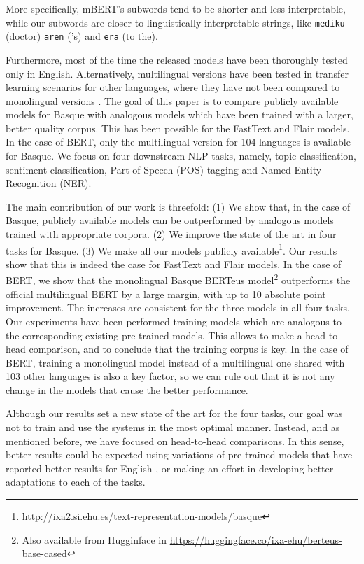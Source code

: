 \documentclass[10pt, a4paper]{article}
\begin{document}
More specifically, mBERT's subwords tend to be shorter and less interpretable, while our subwords are closer to linguistically interpretable strings, like \texttt{mediku} (doctor) \texttt{aren} ('s) and \texttt{era} (to the).

Furthermore, most of the time the released models have been thoroughly tested only in English. Alternatively, multilingual versions have been tested in transfer learning scenarios for other languages, where they have not been compared to monolingual versions \cite{devlin2019bert}.
The goal of this paper is to compare publicly available models for Basque with analogous models which have been trained with a larger, better quality corpus. This has been possible for the FastText and Flair models. In the case of BERT, only the multilingual version for 104 languages is available for Basque. We focus on four downstream NLP tasks, namely, topic classification, sentiment classification, Part-of-Speech (POS) tagging and Named Entity Recognition (NER).

The main contribution of our work is threefold: (1) We show that, in the case of Basque, publicly available models can be outperformed by analogous models trained with appropriate corpora. (2) We improve the state of the art in four tasks for Basque. (3) We make all our models publicly available\footnote{\scriptsize \url{http://ixa2.si.ehu.es/text-representation-models/basque}}. Our results show that this is indeed the case for FastText and Flair models. In the case of BERT, we show that the monolingual Basque BERTeus model\footnote{Also available from Hugginface in \scriptsize{\url{https://huggingface.co/ixa-ehu/berteus-base-cased}}} outperforms the official multilingual BERT by a large margin, with up to 10 absolute point improvement. The increases are consistent for the three models in all four tasks. Our experiments have been performed training models which are analogous to the corresponding existing pre-trained models. This allows to make a head-to-head comparison, and to conclude that the training corpus is key. In the case of BERT, training a monolingual model instead of a multilingual one shared with 103 other languages is also a key factor, so we can rule out that it is not any change in the models that cause the better performance.

Although our results set a new state of the art for the four tasks, our goal was not to train and use the systems in the most optimal manner. Instead, and as mentioned before, we have focused on head-to-head comparisons. In this sense, better results could be expected using variations of pre-trained models that have reported better results for English \cite{liu2019roberta}, or making an effort in developing better adaptations to each of the tasks.
\end{document}
